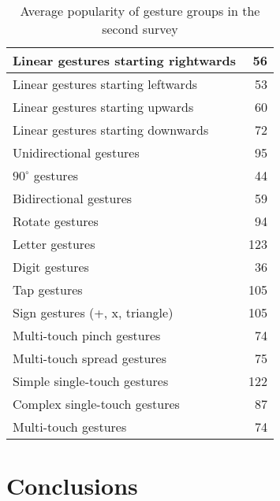 \documentclass{aes130}
\begin{document}
\begin{table} \label{tab:Survey2AverageGroups}
\begin{center}
\begin{tabular}{|l|r|} \hline

Linear gestures starting rightwards &  56 \\ \hline
Linear gestures starting leftwards  &  53 \\ \hline
Linear gestures starting upwards    &  60 \\ \hline
Linear gestures starting downwards  &  72 \\ \hline \hline

Unidirectional gestures             &  95 \\ \hline
$90^\circ$ gestures                 &  44 \\ \hline
Bidirectional gestures              &  59 \\ \hline \hline

Rotate gestures                     &  94 \\ \hline \hline

Letter gestures                     & 123 \\ \hline
Digit gestures                      &  36 \\ \hline
Tap gestures                        & 105 \\ \hline
Sign gestures (+, x, triangle)      & 105 \\ \hline \hline

Multi-touch pinch gestures          &  74 \\ \hline
Multi-touch spread gestures         &  75 \\ \hline \hline

Simple single-touch gestures        & 122 \\ \hline
Complex single-touch gestures       &  87 \\ \hline
Multi-touch gestures                &  74 \\ \hline

\end{tabular}
\end{center}
\caption{Average popularity of gesture groups in the second survey}
\end{table}




\section{Conclusions} \label{sec:Conclusions}
\end{document}
